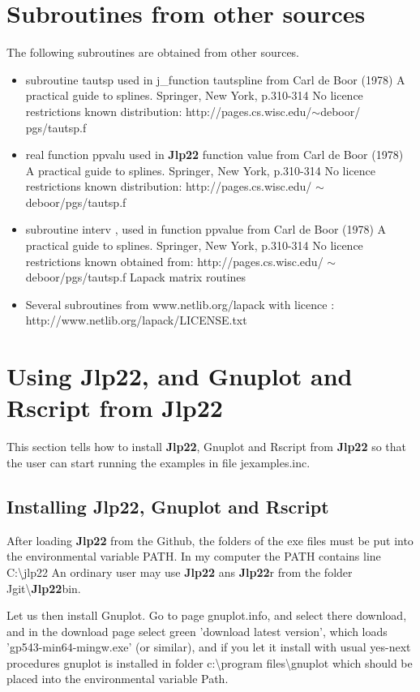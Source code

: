 \section{Subroutines from other sources}
\label{license}
The following subroutines are obtained from other sources.
\begin{itemize}

\item  subroutine tautsp used in j\_function tautspline
from Carl de Boor (1978) A practical guide to splines. Springer, New York, p.310-314
No licence restrictions known
distribution:  http://pages.cs.wisc.edu/$\sim$deboor/ pgs/tautsp.f

\item  real function ppvalu used in \textbf{Jlp22} function value
from Carl de Boor (1978) A practical guide to splines. Springer, New York, p.310-314
No licence restrictions known
distribution: http://pages.cs.wisc.edu/ $\sim$deboor/pgs/tautsp.f

\item subroutine interv , used in function ppvalue
from Carl de Boor (1978) A practical guide to splines. Springer, New York, p.310-314
No licence restrictions known
obtained from: http://pages.cs.wisc.edu/ $\sim$deboor/pgs/tautsp.f
Lapack matrix routines

\item Several subroutines from www.netlib.org/lapack
with licence :\\
http://www.netlib.org/lapack/LICENSE.txt
\end{itemize}
\section{Using \textbf{Jlp22}, and Gnuplot and Rscript from \textbf{Jlp22}}
\label{start}
This section tells how to install \textbf{Jlp22}, Gnuplot and Rscript from \textbf{Jlp22}
so that the user can start
running the examples in file jexamples.inc.
\subsection{Installing \textbf{Jlp22}, Gnuplot and Rscript}
\label{install}
After loading \textbf{Jlp22} from the Github, the folders of the exe files must be
put into the environmental variable PATH. In my computer the PATH contains line C:\textbackslash jlp22
An ordinary user may use \textbf{Jlp22} ans \textbf{Jlp22}r from the folder
Jgit\textbackslash \textbf{Jlp22}bin.

Let us then install Gnuplot. Go to page gnuplot.info, and select there download,
and in the download page select green 'download latest version', which loads
'gp543-min64-mingw.exe' (or similar), and if you let it install with usual yes-next procedures
gnuplot is installed  in folder c:\textbackslash program files\textbackslash gnuplot
which should be placed into the environmental variable Path.


